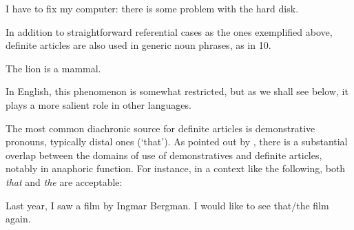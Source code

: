 \begin{listWWNumileveli}
\item 

\begin{styleExample}
\label{bkm:Ref75942712}I have to fix my computer: there is some problem with the hard disk. 

\end{styleExample}

\end{listWWNumileveli}

\begin{styleBodyTextFirst}
In addition to straightforward referential cases as the ones exemplified above, definite articles are also used in generic noun phrases, as in 10. 

\end{styleBodyTextFirst}

\begin{listWWNumileveli}
\item 

\begin{styleExample}
\label{bkm:Ref123549675}The lion is a mammal.

\end{styleExample}

\end{listWWNumileveli}

\begin{styleBodyTextFirst}
In English, this phenomenon is somewhat restricted, but as we shall see below, it plays a more salient role in other languages.

\end{styleBodyTextFirst}

\begin{styleBodytextC}
The most common diachronic source for definite articles is demonstrative pronouns, typically distal ones (‘that’). As pointed out by \citet[332]{Lyons1999}, there is a substantial overlap between the domains of use of demonstratives and definite articles, notably in anaphoric function. For instance, in a context like the following, both \textit{that} and \textit{the} are acceptable:

\end{styleBodytextC}

\begin{listWWNumileveli}
\item 

\begin{styleExample}
Last year, I saw a film by Ingmar Bergman. I would like to see that/the film again.

\end{styleExample}

\end{listWWNumileveli}

